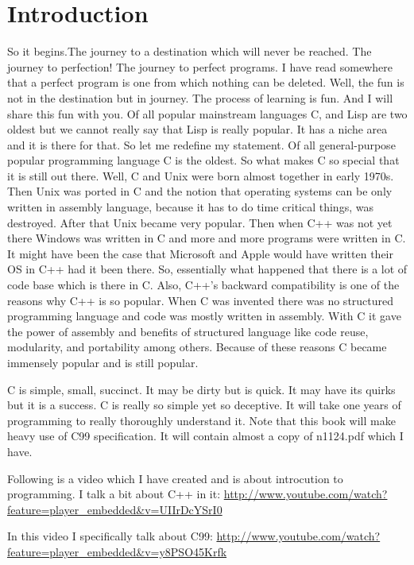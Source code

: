 \chapter{Introduction}
So it begins.The journey to a destination which will never be reached. The
journey to perfection! The journey to perfect programs. I have read somewhere
that a perfect program is one from which nothing can be deleted. Well, the fun
is not in the destination but in journey. The process of learning is fun. And I
will share this fun with you. Of all popular mainstream languages C, and Lisp
are two oldest but we cannot really say that Lisp is really popular. It has a
niche area and it is there for that. So let me redefine my statement. Of all
general-purpose popular programming language C is the oldest. So what makes C
so special that it is still out there. Well, C and Unix were born almost
together in early 1970s. Then Unix was ported in C and the notion that
operating systems can be only written in assembly language, because it has to
do time critical things, was destroyed. After that Unix became very
popular. Then when C++ was not yet there Windows was written in C and more and
more programs were written in C. It might have been the case that Microsoft and
Apple would have written their OS in C++ had it been there. So, essentially
what happened that there is a lot of code base which is there in C. Also, C++'s
backward compatibility is one of the reasons why C++ is so popular. When C was
invented there was no structured programming language and code was mostly
written in assembly. With C it gave the power of assembly and benefits of
structured language like code reuse, modularity, and portability among
others. Because of these reasons C became immensely popular and is still
popular.

C is simple, small, succinct. It may be dirty but is quick. It may have its
quirks but it is a success. C is really so simple yet so deceptive. It will
take one years of programming to really thoroughly understand it. Note that
this book will make heavy use of C99 specification. It will contain almost a
copy of n1124.pdf which I have.

Following is a video which I have created and is about introcution to
programming. I talk a bit about C++ in it:
\url{http://www.youtube.com/watch?feature=player\_embedded\&v=UIIrDcYSrI0}

In this video I specifically talk about C99:
\url{http://www.youtube.com/watch?feature=player\_embedded\&v=y8PSO45Krfk}

